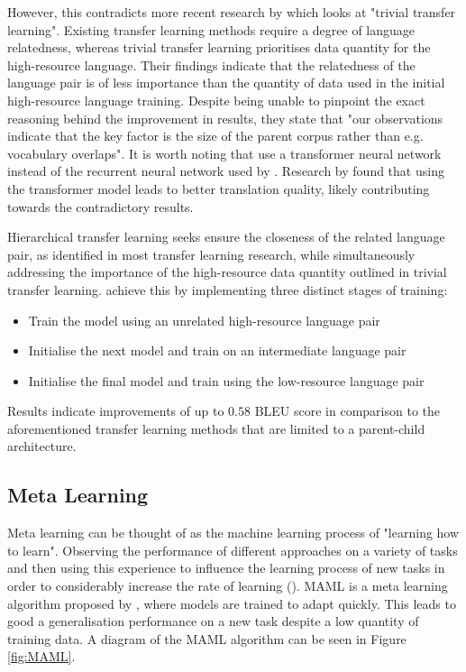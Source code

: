 However, this contradicts more recent research by \cite{kocmi_trivial_2018} which looks at "trivial transfer learning". Existing transfer learning methods require a degree of language relatedness, whereas trivial transfer learning prioritises data quantity for the high-resource language. Their findings indicate that the relatedness of the language pair is of less importance than the quantity of data used in the initial high-resource language training. Despite being unable to pinpoint the exact reasoning behind the improvement in results, they state that "our observations indicate that the key factor is the size of the parent corpus rather than e.g. vocabulary overlaps".
It is worth noting that \cite{kocmi_trivial_2018} use a transformer neural network instead of the recurrent neural network used by \cite{zoph_transfer_2016}. Research by \cite{popel_training_2018} found that using the transformer model leads to better translation quality, likely contributing towards the contradictory results.


Hierarchical transfer learning seeks ensure the closeness of the related language pair, as identified in most transfer learning research, while simultaneously addressing the importance of the high-resource data quantity outlined in trivial transfer learning. \cite{luo_hierarchical_2019} achieve this by implementing three distinct stages of training:

\begin{itemize}
  \item Train the model using an unrelated high-resource language pair
  \item Initialise the next model and train on an intermediate language pair
  \item Initialise the final model and train using the low-resource language pair
\end{itemize}

Results indicate improvements of up to $0.58$ \acrshort{BLEU} score in comparison to the aforementioned transfer learning methods that are limited to a parent-child architecture.

\subsection{Meta Learning}
\label{sec-2:meta_learning}

Meta learning can be thought of as the machine learning process of "learning how to learn". Observing the performance of different approaches on a variety of tasks and then using this experience to influence the learning process of new tasks in order to considerably increase the rate of learning (\cite{vanschoren_meta-learning:_2018}).
\acrfull{MAML} is a meta learning algorithm proposed by \cite{finn_model-agnostic_2017}, where models are trained to adapt quickly. This leads to good a generalisation performance on a new task despite a low quantity of training data.
A diagram of the \acrshort{MAML} algorithm can be seen in Figure \ref{fig:MAML}.

